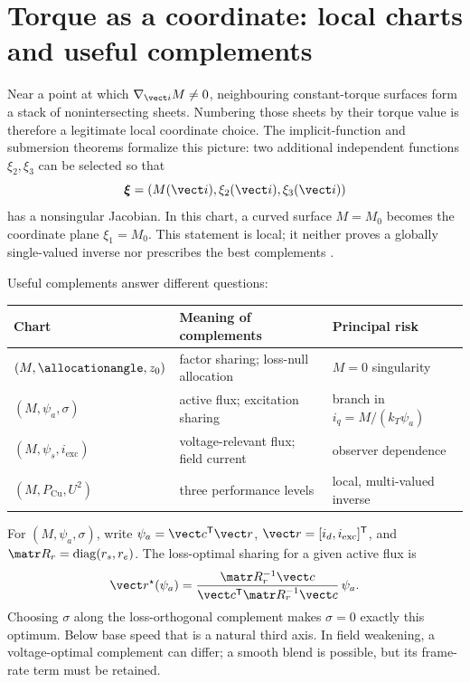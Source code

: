 \section{Torque as a coordinate: local charts and useful complements}
\label{sec:torque-coordinate}

Near a point at which \(\nabla_{\vect i}M\neq0\), neighbouring constant-torque
surfaces form a stack of nonintersecting sheets. Numbering those sheets by
their torque value is therefore a legitimate local coordinate choice. The
implicit-function and submersion theorems formalize this picture: two
additional independent functions \(\xi_2,\xi_3\) can be selected so that
\[
 \boldsymbol\xi=(M(\vect i),\xi_2(\vect i),\xi_3(\vect i))
\]
has a nonsingular Jacobian. In this chart, a curved surface \(M=M_0\) becomes
the coordinate plane \(\xi_1=M_0\). This statement is local; it neither proves
a globally single-valued inverse nor prescribes the best complements
\cite{agrachev2004}.



Useful complements answer different questions:
\begin{center}
\begin{tabular}{lll}
\toprule
Chart & Meaning of complements & Principal risk\\
\midrule
\((M,\allocationangle,z_0)\) & factor sharing; loss-null allocation & \(M=0\) singularity\\
\((M,\psi_a,\sigma)\) & active flux; excitation sharing & branch in \(i_q=M/(k_T\psi_a)\)\\
\((M,\psi_s,i_{\mathrm{exc}})\) & voltage-relevant flux; field current & observer dependence\\
\((M,P_{\mathrm{Cu}},U^2)\) & three performance levels & local, multi-valued inverse\\
\bottomrule
\end{tabular}
\end{center}

For \((M,\psi_a,\sigma)\), write
\(\psi_a=\vect c^{\mathsf T}\vect r\),
\(\vect r=[i_d,i_{\mathrm{exc}}]^{\mathsf T}\), and
\(\matr R_r=\operatorname{diag}(r_s,r_e)\). The loss-optimal sharing for a
given active flux is
\begin{equation}
 \vect r^\star(\psi_a)=
 \frac{\matr R_r^{-1}\vect c}
 {\vect c^{\mathsf T}\matr R_r^{-1}\vect c}\,\psi_a.
 \label{eq:loss-optimal-sharing}
\end{equation}
Choosing \(\sigma\) along the loss-orthogonal complement makes
\(\sigma=0\) exactly this optimum. Below base speed that is a natural third
axis. In field weakening, a voltage-optimal complement can differ; a smooth
blend is possible, but its frame-rate term must be retained.

